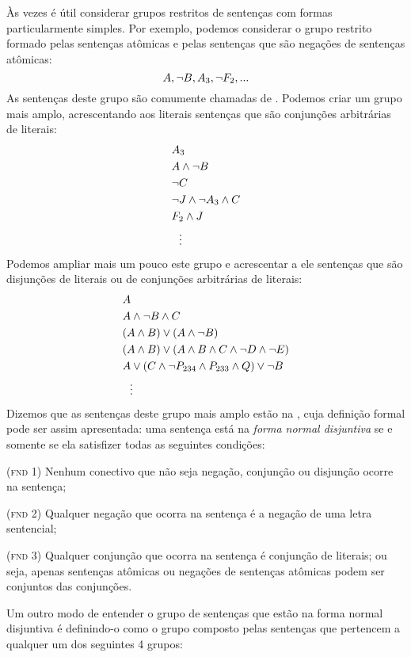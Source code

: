 Às vezes é útil considerar grupos restritos de sentenças com formas particularmente simples.
Por exemplo, podemos considerar o grupo restrito formado pelas sentenças atômicas e pelas sentenças que são negações de sentenças atômicas:
$$A, \neg B, A_3, \neg F_2, ...$$
As sentenças deste grupo  são comumente chamadas de .
Podemos criar um grupo mais amplo, acrescentando aos literais sentenças que são conjunções arbitrárias de literais:
	\begin{align*}
			& A_3 \\
			& A \wedge \neg B \\
			& \neg C \\
			& \neg J \wedge \neg A_3 \wedge  C \\
			& F_2 \wedge  J \\
			& \ \ \vdots
	\end{align*}
Podemos ampliar mais um pouco este grupo e acrescentar a ele sentenças que são disjunções de literais ou de conjunções arbitrárias de literais:
	\begin{align*}
  		& A \\
  		& A \wedge \lnot B \wedge C\\
  		& (A \wedge B) \vee (A \wedge \neg B)\\
  		& (A \wedge B) \vee (A \wedge  B \wedge C \wedge \neg D \wedge \neg E)\\
  		& A \vee (C \wedge \neg P_{234} \wedge P_{233} \wedge Q) \vee \neg B\\
  		& \ \ \vdots
	\end{align*}
Dizemos que as sentenças deste grupo mais amplo estão na , cuja definição formal pode ser assim apresentada:
uma sentença está na \textit{forma normal disjuntiva} se e somente se ela satisfizer todas as seguintes condições:
	\begin{earg}
		\item[(\textsc{fnd 1})] Nenhum conectivo que não seja negação, conjunção ou disjunção ocorre na sentença;
		\item[(\textsc{fnd 2})] Qualquer negação que ocorra na sentença é a negação de uma letra sentencial;
		\item[(\textsc{fnd 3})] Qualquer conjunção que ocorra na sentença é conjunção de literais; ou seja, apenas sentenças atômicas ou negações de sentenças atômicas podem ser conjuntos das conjunções.
	\end{earg}
Um outro modo de entender o grupo de sentenças que estão na forma normal disjuntiva é definindo-o como o grupo composto pelas sentenças que pertencem a qualquer um dos seguintes 4 grupos:
